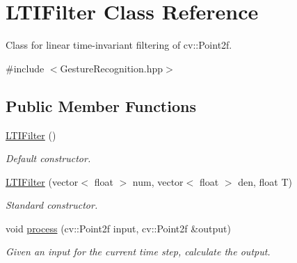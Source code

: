 \hypertarget{classLTIFilter}{\section{\-L\-T\-I\-Filter \-Class \-Reference}
\label{classLTIFilter}
}


\-Class for linear time-\/invariant filtering of cv\-::\-Point2f.  




{\ttfamily \#include $<$\-Gesture\-Recognition.\-hpp$>$}

\subsection*{\-Public \-Member \-Functions}
\begin{DoxyCompactItemize}
\item 
\hyperlink{classLTIFilter_a0d7b7751a8aa6a13f29c0400054289a2}{\-L\-T\-I\-Filter} ()
\begin{DoxyCompactList}\small\item\em \-Default constructor. \end{DoxyCompactList}\item 
\hyperlink{classLTIFilter_a10da1f0cc3ebd01d83d233942d7c2a9a}{\-L\-T\-I\-Filter} (vector$<$ float $>$ num, vector$<$ float $>$ den, float \-T)
\begin{DoxyCompactList}\small\item\em \-Standard constructor. \end{DoxyCompactList}\item 
void \hyperlink{classLTIFilter_a15eea87b68dc6ea1922dc456a0f23586}{process} (cv\-::\-Point2f input, cv\-::\-Point2f \&output)
\begin{DoxyCompactList}\small\item\em \-Given an input for the current time step, calculate the output. \end{DoxyCompactList}\end{DoxyCompactItemize}
